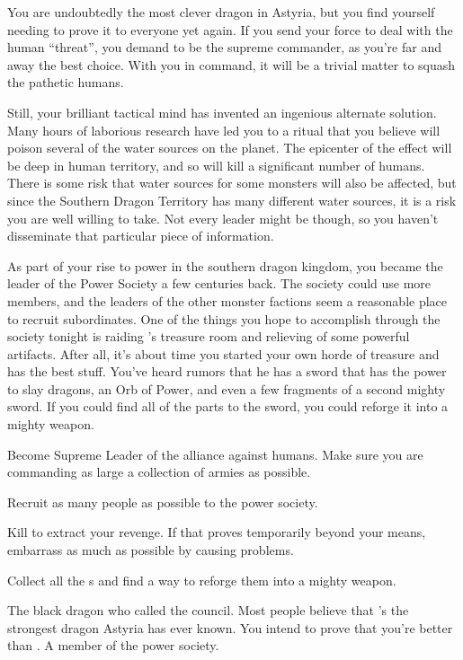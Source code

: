 \documentclass[char]{guildcamp2}
\begin{document}
You are undoubtedly the most clever dragon in Astyria, but you find yourself needing to prove it to everyone yet again. If you send your force to deal with the human ``threat'', you demand to be the supreme commander, as you're far and away the best choice.  With you in command, it will be a trivial matter to squash the pathetic humans.

Still, your brilliant tactical mind has invented an ingenious alternate solution. Many hours of laborious research have led you to a ritual that you believe will poison several of the water sources on the planet. The  epicenter of the effect will be deep in human territory, and so will kill a significant number of humans. There is some risk that water sources for some monsters will also be affected, but since the Southern Dragon Territory has many different water sources, it is a risk you are well willing to take. Not every leader might be though, so you haven't disseminate that particular piece of information.
		
As part of your rise to power in the southern dragon kingdom, you became the leader of the Power Society a few centuries back. The society could use more members, and the leaders of the other monster factions seem a reasonable place to recruit subordinates. One of the things you hope to accomplish through the society tonight is raiding \cOnyx{}'s treasure room and relieving \cOnyx{\them} of some powerful artifacts. After all, it's about time you started your own horde of treasure and \cOnyx{} has the best stuff. You've heard rumors that he has a sword that has the power to slay dragons, an Orb of Power, and even a few fragments of a second mighty sword. If you could find all of the parts to the sword, you could reforge it into a mighty weapon.		

	\begin{itemz}[Goals]
	\item Become Supreme Leader of the alliance against humans. Make sure you are commanding as large a collection of armies as possible.
	\item Recruit as many people as possible to the power society.
	\item Kill \cOnyx{} to extract your revenge. If that proves temporarily beyond your means, embarrass \cOnyx{} as much as possible by causing problems.
	\item Collect all the \iVorpalSwordofWonder{}s and find a way to reforge them into a mighty weapon.
\end{itemz}

\begin{contacts}
  \contact{\cOnyx{}} The black dragon who called the council. Most people believe that \cOnyx{\they}'s the strongest dragon Astyria has ever known. You intend to prove that you're better than \cOnyx{\them}.
	\contact{\cMinotaur{}} A member of the power society.
\end{contacts}
\end{document}
